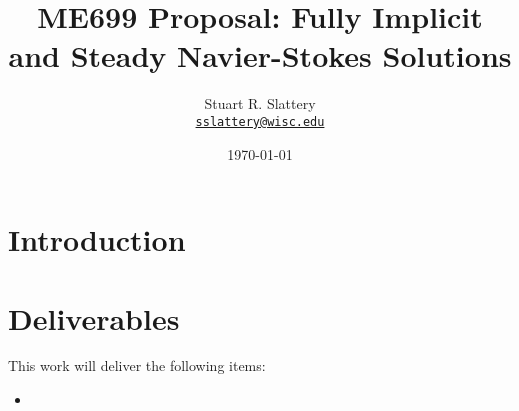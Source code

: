 \documentclass[letterpaper,12pt]{article}
\author{Stuart R. Slattery
\\ \href{mailto:sslattery@wisc.edu}{\texttt{sslattery@wisc.edu}}
}
\date{\today}
\title{ME699 Proposal: Fully Implicit and Steady Navier-Stokes Solutions}
\begin{document}
\maketitle

\section{Introduction}

\section{Deliverables}

This work will deliver the following items:

\begin{itemize}
\item
\end{itemize}


\pagebreak


\end{document}
